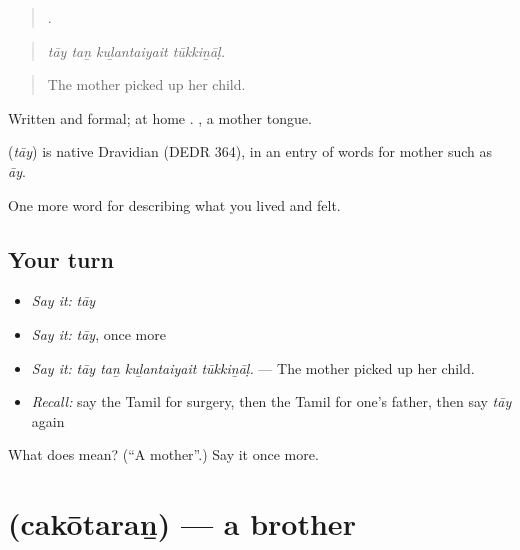 \begin{quote}
   .
\end{quote}

\begin{quote}
\emph{tāy taṉ kuḻantaiyait tūkkiṉāḷ.}
\end{quote}

\begin{quote}
The mother picked up her child.
\end{quote}

Written and formal; at home . , a mother tongue.

\begin{cousinweb}
\textbf{} (\emph{tāy}) is native Dravidian (DEDR 364), in an entry of words for mother such as  \emph{āy}.
\end{cousinweb}

\begin{grammarlens}[title={What you've built}]
One more word for describing what you lived and felt.
\end{grammarlens}

\subsection*{Your turn}
\begin{itemize}
\raggedright
  \item \emph{Say it:} \emph{tāy}
  \item \emph{Say it:} \emph{tāy}, once more
  \item \emph{Say it:} \emph{tāy taṉ kuḻantaiyait tūkkiṉāḷ.} — The mother picked up her child.
  \item \emph{Recall:} say the Tamil for surgery, then the Tamil for one’s father, then say \emph{tāy} again
\end{itemize}

\begin{tcolorbox}[breakable,colback=teal!4,colframe=teal!35!black,title={Before you move on}]
What does  mean? (\textquotedblleft{}A mother\textquotedblright{}.) Say it once more.
\end{tcolorbox}
\section[\texorpdfstring{\ta{சகோதரன்} (cakōtaraṉ)}{சகோதரன் (cakōtaraṉ)}]{ (cakōtaraṉ) — a brother}

\label{lesson:TA-C492-cakotaran}



